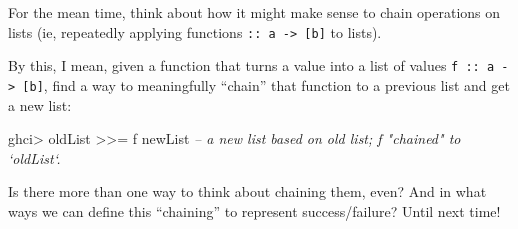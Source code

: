 \documentclass[]{article}
\newenvironment{Shaded}{}{}
\newcommand{\CommentTok}[1]{\textcolor[rgb]{0.38,0.63,0.69}{\textit{#1}}}
\newcommand{\FunctionTok}[1]{\textcolor[rgb]{0.02,0.16,0.49}{#1}}
\newcommand{\NormalTok}[1]{#1}
\begin{document}
For the mean time, think about how it might make sense to chain operations on
lists (ie, repeatedly applying functions
\texttt{::\ a\ -\textgreater{}\ {[}b{]}} to lists).

By this, I mean, given a function that turns a value into a list of values
\texttt{f\ ::\ a\ -\textgreater{}\ {[}b{]}}, find a way to meaningfully
``chain'' that function to a previous list and get a new list:

\begin{Shaded}
\begin{Highlighting}[]
\NormalTok{ghci}\FunctionTok{>}\NormalTok{ oldList }\FunctionTok{>>=}\NormalTok{ f}
\NormalTok{newList             }\CommentTok{-- a new list based on old list; f "chained" to `oldList`.}
\end{Highlighting}
\end{Shaded}

Is there more than one way to think about chaining them, even? And in what ways
we can define this ``chaining'' to represent success/failure? Until next time!
\end{document}
